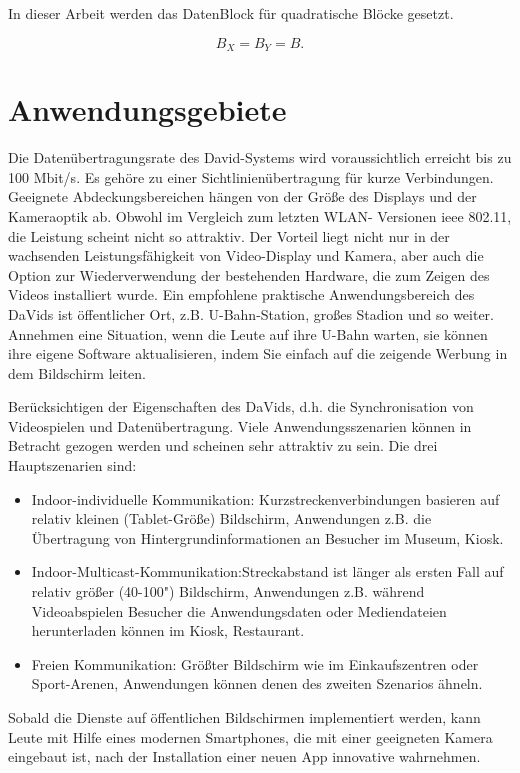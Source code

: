 \newpage
In dieser Arbeit werden das DatenBlock für quadratische Blöcke gesetzt.

\begin{equation}
   B_X = B_Y = B.
\end{equation}





\section{Anwendungsgebiete} 

Die Datenübertragungsrate des David-Systems wird voraussichtlich erreicht bis zu 100 Mbit/s. Es gehöre	zu einer Sichtlinienübertragung für kurze Verbindungen. Geeignete Abdeckungsbereichen hängen von der Größe des Displays und der Kameraoptik ab. Obwohl im Vergleich zum letzten WLAN- Versionen \gls{ieee} 802.11, die Leistung scheint nicht so attraktiv. Der Vorteil liegt nicht nur in der wachsenden Leistungsfähigkeit von Video-Display und Kamera, aber auch die Option zur Wiederverwendung der bestehenden Hardware, die zum Zeigen des Videos installiert wurde. Ein empfohlene praktische Anwendungsbereich des DaVids ist öffentlicher Ort, z.B. U-Bahn-Station, großes Stadion und so weiter. Annehmen eine Situation, wenn die Leute auf ihre U-Bahn warten, sie können ihre eigene Software aktualisieren, indem Sie einfach auf die zeigende Werbung in dem Bildschirm leiten.

Berücksichtigen der Eigenschaften des DaVids, d.h. die Synchronisation von Videospielen und Datenübertragung. Viele Anwendungsszenarien können in Betracht gezogen werden und scheinen sehr attraktiv zu sein. Die drei Hauptszenarien sind:

\begin{itemize}
  \item Indoor-individuelle Kommunikation: Kurzstreckenverbindungen basieren auf relativ kleinen (Tablet-Größe) Bildschirm, Anwendungen z.B. die Übertragung von Hintergrundinformationen an Besucher im Museum, Kiosk.
  \item Indoor-Multicast-Kommunikation:Streckabstand ist länger als ersten Fall auf relativ größer (40-100") Bildschirm, Anwendungen z.B. während Videoabspielen Besucher die Anwendungsdaten oder Mediendateien herunterladen können im Kiosk, Restaurant.
  \item Freien Kommunikation: Größter Bildschirm wie im Einkaufszentren oder Sport-Arenen, Anwendungen können denen des zweiten Szenarios ähneln.
\end{itemize}

Sobald die Dienste auf öffentlichen Bildschirmen implementiert werden, kann Leute mit Hilfe eines modernen Smartphones, die mit einer geeigneten Kamera eingebaut ist, nach der Installation einer neuen App innovative wahrnehmen.





















